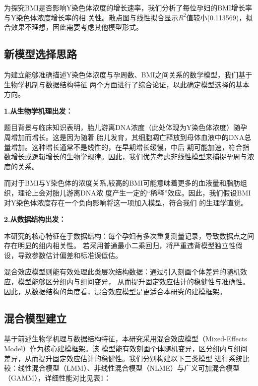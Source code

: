 \documentclass{article}
\begin{document}
为探究BMI是否影响Y染色体浓度的增长速率，我们分析了每位孕妇的BMI增长率与Y染色体浓度增长率的相
关性。散点图与线性拟合显示$R^2$值较小(0.113569)，拟合效果不理想，因此需要考虑其他模型形式。

\subsection{\textbf{新模型选择思路}}
为建立能够准确描述Y染色体浓度与孕周数、BMI之间关系的数学模型，我们基于生物学机制与数据结构特征
两个方面进行了综合论证，以此确定模型选择的基本方向。

\textbf{1.从生物学机理出发：}

题目背景与临床知识表明，胎儿游离DNA浓度（此处体现为Y染色体浓度）随孕周增加而增长。这是因为随着
胎儿发育，其细胞凋亡释放到母体血液中的DNA总量增加。这种增长通常不是线性的，在早期增长缓慢，中后
期可能加速，符合指数增长或逻辑增长的生物学规律。因此，我们优先考虑非线性模型来捕捉孕周与浓度的关系。

而对于BMI与Y染色体的浓度关系,较高的BMI可能意味着更多的血液量和脂肪组织，理论上会对胎儿游离DNA浓
度产生一定的“稀释”效应。因此，我们假设BMI对Y染色体浓度存在一个负向影响将这一项加入模型，符合我们
的生理学直觉。

\textbf{2.从数据结构出发：}

本研究的核心特征在于数据结构：每个孕妇有多次重复测量记录，导致数据点之间存在明显的组内相关性。
若采用普通最小二乘回归，将严重违背模型独立性假设，导致参数估计偏差和标准误低估。

混合效应模型则能有效处理此类层次结构数据：通过引入刻画个体差异的随机效应，模型能够区分组内与组间变异，
从而提升固定效应估计的稳健性与准确性。因此，从数据结构的角度看，混合效应模型是更适合本研究的建模框架。
\subsection{\textbf{混合模型建立}}
基于前述生物学机理与数据结构特征，本研究采用混合效应模型（Mixed-Effects Model）作为核心建模框架。该
模型能有效刻画个体随机变异，区分组内与组间差异，从而提升固定效应估计的稳健性。我们分别构建以下三类模型
进行系统比较：线性混合模型（LMM）、非线性混合模型（NLME）与广义可加混合模型（GAMM），详细性能对比见表1：
\end{document}
